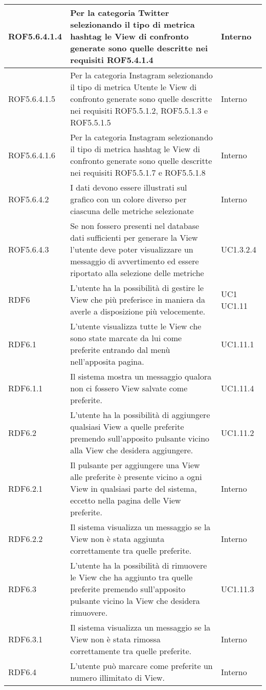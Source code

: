 \begin{center}
\begin{longtable}{| p{2.5cm} | p{8cm} | p{2cm} |}
		\hline
		ROF5.6.4.1.4  &  Per la categoria Twitter selezionando il tipo di metrica hashtag le View di confronto generate sono quelle descritte nei requisiti ROF5.4.1.4 &  Interno \\
		\hline
		ROF5.6.4.1.5  &  Per la categoria Instagram selezionando il tipo di metrica Utente le View di confronto generate sono quelle descritte nei requisiti ROF5.5.1.2, ROF5.5.1.3 e ROF5.5.1.5 &  Interno \\
		\hline
		ROF5.6.4.1.6  &  Per la categoria Instagram selezionando il tipo di metrica hashtag le View di confronto generate sono quelle descritte nei requisiti ROF5.5.1.7 e ROF5.5.1.8  &  Interno \\
		\hline
		ROF5.6.4.2  &  I dati devono essere illustrati sul grafico con un colore diverso per ciascuna delle metriche selezionate  &  Interno \\
		\hline
		ROF5.6.4.3  &  Se non fossero presenti nel database dati sufficienti per generare la View l'utente deve poter visualizzare un messaggio di avvertimento ed essere riportato alla selezione delle metriche  &  UC1.3.2.4 \\
		\hline




		RDF6  & L'utente ha la possibilità di gestire le View che più preferisce in maniera da averle a disposizione più velocemente. &  UC1 \newline UC1.11 \\
		\hline
		RDF6.1  & L'utente visualizza tutte le View che sono state marcate da lui come preferite entrando dal menù nell'apposita pagina. & UC1.11.1 \\
		\hline
		RDF6.1.1  & Il sistema mostra un messaggio qualora non ci fossero View salvate come preferite. &  UC1.11.4 \\
		\hline
		RDF6.2  & L'utente ha la possibilità di aggiungere qualsiasi View a quelle preferite premendo sull'apposito pulsante vicino alla View che desidera aggiungere. & UC1.11.2 \\
		\hline
		RDF6.2.1  & Il pulsante per aggiungere una View alle preferite è presente vicino a ogni View in qualsiasi parte del sistema, eccetto nella pagina delle View preferite.  & Interno \\
		\hline
		RDF6.2.2  & Il sistema visualizza un messaggio se la View non è stata aggiunta correttamente tra quelle preferite.  & Interno \\
		\hline
		RDF6.3  & L'utente ha la possibilità di rimuovere le View che ha aggiunto tra quelle preferite premendo sull'apposito pulsante vicino la View che desidera rimuovere.  &  UC1.11.3 \\
		\hline
		RDF6.3.1  & Il sistema visualizza un messaggio se la View non è stata rimossa correttamente tra quelle preferite.  &  Interno \\
		\hline
		RDF6.4 & L'utente può marcare come preferite un numero illimitato di View. &  Interno \\
		\hline


\end{longtable}
\end{center}
